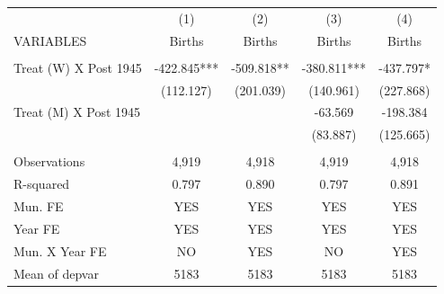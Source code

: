 \begin{tabular}{lcccc} \hline
 & (1) & (2) & (3) & (4) \\
VARIABLES & Births & Births & Births & Births \\ \hline
 &  &  &  &  \\
Treat (W) X Post 1945 & -422.845*** & -509.818** & -380.811*** & -437.797* \\
 & (112.127) & (201.039) & (140.961) & (227.868) \\
Treat (M) X Post 1945 &  &  & -63.569 & -198.384 \\
 &  &  & (83.887) & (125.665) \\
 &  &  &  &  \\
Observations & 4,919 & 4,918 & 4,919 & 4,918 \\
R-squared & 0.797 & 0.890 & 0.797 & 0.891 \\
Mun. FE & YES & YES & YES & YES \\
Year FE & YES & YES & YES & YES \\
Mun. X Year FE & NO & YES & NO & YES \\
 Mean of depvar & 5183 & 5183 & 5183 & 5183 \\ \hline
\end{tabular}
